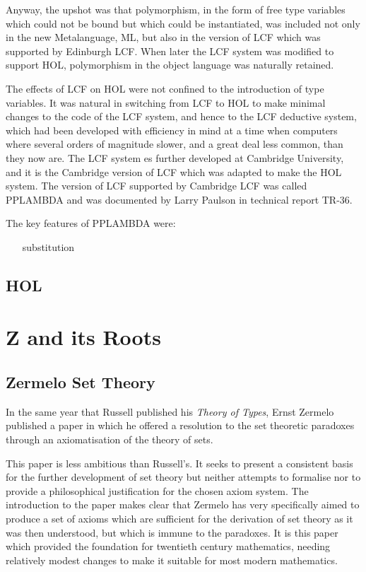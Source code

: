 \documentclass[10pt,titlepage]{book}
\begin{document}
Anyway, the upshot was that polymorphism, in the form of free type variables which could not be bound but which could be instantiated, was included not only in the new Metalanguage, ML, but also in the version of LCF which was supported by Edinburgh LCF.
When later the LCF system was modified to support HOL, polymorphism in the object language was naturally retained.
 
The effects of LCF on HOL were not confined to the introduction of type variables.
It was natural in switching from LCF to HOL to make minimal changes to the code of the LCF system, and hence to the LCF deductive system, which had been developed with efficiency in mind at a time when computers where several orders of magnitude slower, and a great deal less common, than they now are.
The LCF system es further developed at Cambridge University, and it is the Cambridge version of LCF which was adapted to make the HOL system.
The version of LCF supported by Cambridge LCF was called PPLAMBDA and was documented by Larry Paulson in technical report TR-36.

The key features of PPLAMBDA were:

\begin{itemize}
\item[substitution]
\end{itemize}

\subsection{HOL}



\section{Z and its Roots}

\subsection{Zermelo Set Theory}

In the same year that Russell published his {\it Theory of Types}, Ernst Zermelo published a paper\cite{zermelo08} in which he offered a resolution to the set theoretic paradoxes through an axiomatisation of the theory of sets.

This paper is less ambitious than Russell's.
It seeks to present a consistent basis for the further development of set theory but neither attempts to formalise nor to provide a philosophical justification for the chosen axiom system.
The introduction to the paper makes clear that Zermelo has very specifically aimed to produce a set of axioms which are sufficient for the derivation of set theory as it was then understood, but which is immune to the paradoxes.
It is this paper which provided the foundation for twentieth century mathematics, needing relatively modest changes to make it suitable for most modern mathematics.
\end{document}
